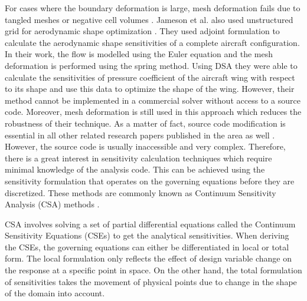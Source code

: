 For cases where the boundary deformation is large, mesh deformation fails due to tangled meshes or negative cell volumes \cite{morris2008cfd}. Jameson et al. also used unstructured grid for aerodynamic shape optimization \cite{cambridge2004aerodynamic}. They used adjoint formulation to calculate the aerodynamic shape sensitivities of a complete aircraft configuration. In their work, the flow is modelled using the Euler equation and the mesh deformation is performed using the spring method. Using DSA they were able to calculate the sensitivities of pressure coefficient of the aircraft wing with respect to its shape and use this data to optimize the shape of the wing. However, their method cannot be implemented in a commercial solver without access to a source code. Moreover, mesh deformation is still used in this approach which reduces the robustness of their technique. As a matter of fact, source code modification is essential in all other related research papers published in the area as well \cite{gamboa2009optimization, pandya1997gradient, kim2001aerodynamic, lyu2014aerodynamic}. However, the source code is usually inaccessible and very complex. Therefore, there is a great interest in sensitivity calculation techniques which require minimal knowledge of the analysis code. This can be achieved using the sensitivity formulation that operates on the governing equations before they are discretized. These methods are commonly known as Continuum Sensitivity Analysis (CSA) methods \cite{haftka1989recent}.

CSA involves solving a set of partial differential equations called the Continuum Sensitivity Equations (CSEs) to get the analytical sensitivities. When deriving the CSEs, the governing equations can either be differentiated in local or total form. The local formulation only reflects the effect of design variable change on the response at a specific point in space. On the other hand, the total formulation of sensitivities takes the movement of physical points due to change in the shape of the domain into account.

